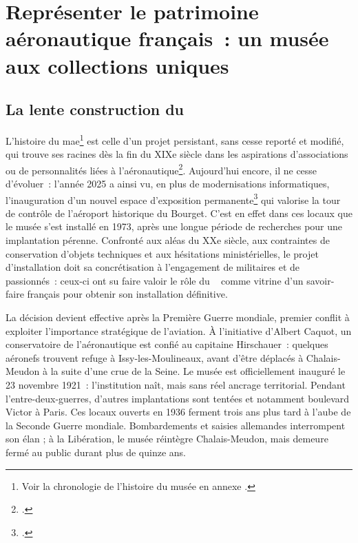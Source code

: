 \section{\label{I-A-1}Représenter le patrimoine aéronautique français~: un musée aux collections uniques}

\subsection{La lente construction du \mae}

L'histoire du \acf{mae}\footnote{Voir la chronologie de l'histoire du musée en annexe .} est celle d'un projet persistant, sans cesse reporté et modifié, qui trouve ses racines dès la fin du XIXe siècle dans les aspirations d'associations ou de personnalités liées à l'aéronautique\footcite{terrierAeroportParisBourget2019}. Aujourd'hui encore, il ne cesse d'évoluer~: l'année 2025 a ainsi vu, en plus de modernisations informatiques, l'inauguration d'un nouvel espace d'exposition permanente\footcite{museedelairetdelespaceHallNavigationAerienne2025} qui valorise la tour de contrôle de l'aéroport historique du Bourget. C'est en effet dans ces locaux que le musée s'est installé en 1973, après une longue période de recherches pour une implantation pérenne. Confronté aux aléas du XXe siècle, aux contraintes de conservation d'objets techniques et aux hésitations ministérielles, le projet d'installation doit sa concrétisation à l'engagement de militaires et de passionnés~: ceux-ci ont su faire valoir le rôle du \mae~ comme vitrine d'un savoir-faire français pour obtenir son installation définitive.

La décision devient effective après la Première Guerre mondiale, premier conflit à exploiter l'importance stratégique de l'aviation. À l'initiative d'Albert Caquot, un conservatoire de l'aéronautique est confié au capitaine Hirschauer~: quelques aéronefs trouvent refuge à Issy-les-Moulineaux, avant d'être déplacés à Chalais-Meudon à la suite d'une crue de la Seine. Le musée est officiellement inauguré le 23 novembre 1921~: l'institution naît, mais sans réel ancrage territorial. Pendant l'entre-deux-guerres, d'autres implantations sont tentées et notamment boulevard Victor à Paris. Ces locaux ouverts en 1936 ferment trois ans plus tard à l'aube de la Seconde Guerre mondiale. Bombardements et saisies allemandes interrompent son élan ; à la Libération, le musée réintègre Chalais-Meudon, mais demeure fermé au public durant plus de quinze ans.

